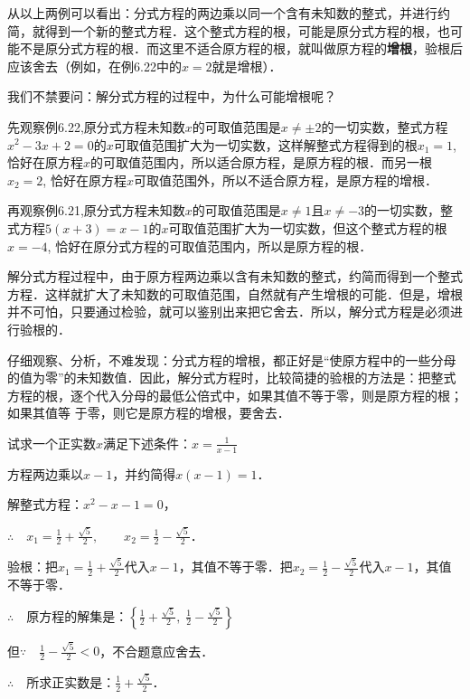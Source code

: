 从以上两例可以看出：分式方程的两边乘以同一个含有未知数的整式，并进行约简，就得到一个新的整式方程．这个整式方程的根，可能是原分式方程的根，也可能不是原分式方程的根．而这里不适合原方程的根，就叫做原方程的\textbf{增根}，验根后应该舍去（例如，在例6.22中的$x=2$就是增根）．

我们不禁要问：解分式方程的过程中，为什么可能增根呢？

先观察例6.22,原分式方程未知数$x$的可取值范围是$x\ne \pm2$的一切实数，整式方程$x^2-3x+2=0$的$x$可取值范围扩大为一切实数，这样解整式方程得到的根$x_1=1$, 恰好在原方程$x$的可取值范围内，所以适合原方程，是原方程的根．而另一根$x_2=2$, 恰好在原方程$x$可取值范围外，所以不适合原方程，是原方程的增根．

再观察例6.21,原分式方程未知数$x$的可取值范围是$x\ne 1$且$x\ne -3$的一切实数，整式方程$5(x+3)=x-1$的$x$可取值范围扩大为一切实数，但这个整式方程的根$x=-4$, 恰好在原分式方程的可取值范围内，所以是原方程的根．

解分式方程过程中，由于原方程两边乘以含有未知数的整式，约简而得到一个整式方程．这样就扩大了未知数的可取值范围，自然就有产生增根的可能．但是，增根并不可怕，只要通过检验，就可以鉴别出来把它舍去．所以，解分式方程是必须进行验根的．

仔细观察、分析，不难发现：分式方程的增根，都正好是“使原方程中的一些分母的值为零”的未知数值．因此，解分式方程时，比较简捷的验根的方法是：把整式方程的根，逐个代入分母的最低公倍式中，如果其值不等于零，则是原方程的根；如果其值等
于零，则它是原方程的增根，要舍去．


\begin{example}
    试求一个正实数$x$满足下述条件：$x=\frac{1}{x-1}$
\end{example}

\begin{solution}
方程两边乘以$x-1$，并约简得$x(x-1)=1$．

解整式方程：$x^2-x-1=0$，

$\therefore\quad x_1=\frac{1}{2}+\frac{\sqrt{5}}{2},\qquad x_2=\frac{1}{2}-\frac{\sqrt{5}}{2}$．

验根：把$x_1=\frac{1}{2}+\frac{\sqrt{5}}{2}$代入$x-1$，其值不等于零．把$x_2=\frac{1}{2}-\frac{\sqrt{5}}{2}$代入$x-1$，其值不等于零．

$\therefore\quad $原方程的解集是：$\left\{\frac{1}{2}+\frac{\sqrt{5}}{2},\; \frac{1}{2}-\frac{\sqrt{5}}{2}\right\}$

但$\because\quad \frac{1}{2}-\frac{\sqrt{5}}{2}<0$，不合题意应舍去．

$\therefore\quad $所求正实数是：$\frac{1}{2}+\frac{\sqrt{5}}{2}$．
\end{solution}

